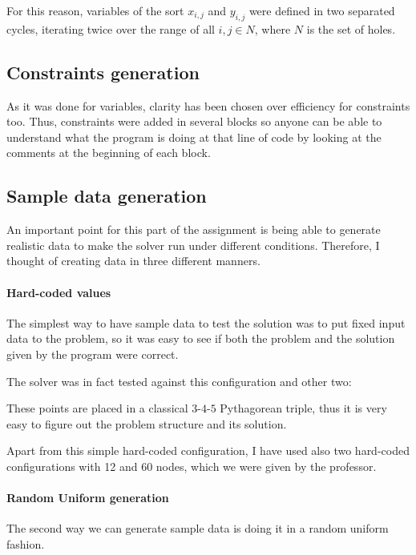 For this reason, variables of the sort $x_{i,j}$ and $y_{i,j}$ were defined in
two separated cycles, iterating twice over the range of all $i,j\in{N}$, where
$N$ is the set of holes.

\subsection{Constraints generation}
As it was done for variables, clarity has been chosen over efficiency for
constraints too. Thus, constraints were added in several blocks so anyone can
be able to understand what the program is doing at that line of code by looking
at the comments at the beginning of each block.

\subsection{Sample data generation}
An important point for this part of the assignment is being able to generate
realistic data to make the solver run under different conditions.
Therefore, I thought of creating data in three different manners.

\paragraph{Hard-coded values} The simplest way to have sample data to test the
solution was to put fixed input data to the problem, so it was easy to see if
both the problem and the solution given by the program were correct.

The solver was in fact tested against this configuration and other two:

\begin{figure}[h!]
\centering
{}
\end{figure}

These points are placed in a classical $3$-$4$-$5$ Pythagorean triple, thus it
is very easy to figure out the problem structure and its solution.

Apart from this simple hard-coded configuration, I have used also two hard-coded
configurations with 12 and 60 nodes, which we were given by the professor.

\paragraph{Random Uniform generation} The second way we can generate sample data
is doing it in a random uniform fashion.

